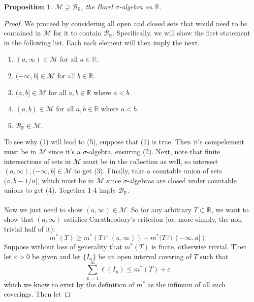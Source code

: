 \documentclass[12pt]{article}
\theoremstyle{plain}
\newtheorem{prop}[thm]{Proposition}
\theoremstyle{definition}
\theoremstyle{remark}
\begin{document}
\begin{prop} $\mathscr{M}\supsetneq \mathscr{B}_\mathbb{R}$, the Borel $\sigma$-algebra on $\mathbb{R}$. 
\end{prop}
\begin{proof} We proceed by considering all open and closed sets that would need to be contained in $\mathscr{M}$ for it to contain $\mathscr{B}_\mathbb{R}$. Specifically, we will show the first statement in the following list. Each each element will then imply the next.
\begin{enumerate}
    \item $(a,\infty)\in\mathscr{M}$ for all $a\in\mathbb{R}$.
    \item $(-\infty,b]\in\mathscr{M}$ for all $b\in\mathbb{R}$.
    \item $(a,b]\in\mathscr{M}$ for all $a,b\in\mathbb{R}$ where $a<b$.
    \item $(a,b)\in\mathscr{M}$ for all $a,b\in\mathbb{R}$ where $a<b$.
    \item $\mathscr{B}_\mathbb{R}\in\mathscr{M}$.
\end{enumerate}
To see why (1) will lead to (5), suppose that (1) is true. Then it's compelement must be in $\mathscr{M}$ since it's a $\sigma$-algebra, ensuring (2). Next, note that finite intersections of sets in $\mathscr{M}$ must be in the collection as well, so intersect $(a,\infty), (-\infty,b]\in\mathscr{M}$ to get (3). Finally, take a countable union of sets $(a,b-1/n]$, which must be in $\mathscr{M}$ since $\sigma$-algebras are closed under countable unions to get (4). Together 1-4 imply $\mathscr{B}_\mathbb{R}$.
\\
\\
Now we just need to show $(a,\infty)\in\mathscr{M}$. So for any arbitrary $T\subset\mathbb{R}$, we want to show that $(a,\infty)$ satisfies Caratheodory's criterion (or, more simply, the non-trivial half of it):
\begin{equation}
    \label{borel.cara}
    m^*(T) \geq m^*(T \cap (a,\infty)) + 
    m^*(T \cap (-\infty,a])
\end{equation}
Suppose without loss of generality that $m^*(T)$ is finite, otherwise trivial. Then let $\varepsilon>0$ be given and let $\{I_n\}$ be an open interval covering of $T$ such that
\begin{equation}
    \label{borel.approx}
    \sum^\infty_{n=1} \ell(I_n) \leq m^*(T) + \varepsilon
\end{equation}
which we know to exist by the definition of $m^*$ as the infimum of all such coverings. Then let 

\end{proof}
\end{document}

